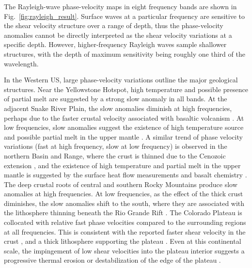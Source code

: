 The Rayleigh-wave phase-velocity maps in eight frequency bands are shown in Fig.~\ref{fig:rayleigh_result}. Surface waves at a particular frequency are sensitive to the shear velocity structure over a range of depth, thus the phase-velocity anomalies cannot be directly interpreted as the shear velocity variations at a specific depth. However, higher-frequency Rayleigh waves sample shallower structures, with the depth of maximum sensitivity being roughly one third of the wavelength.

In the Western US, large phase-velocity variations outline the major geological structures. Near the Yellowstone Hotspot, high temperature and possible presence of partial melt are suggested by a strong slow anomaly in all bands. At the adjacent Snake River Plain, the slow anomalies diminish at high frequencies, perhaps due to the faster crustal velocity associated with basaltic volcanism \citep[e.g.,][]{Sparlin:1982cx,Peng:1998dm}. At low frequencies, slow anomalies suggest the existence of high temperature source and possible partial melt in the upper mantle \citep[e.g.,][]{Saltzer:1997jh}.
A similar trend of phase velocity variations (fast at high frequency, slow at low frequency) is observed in the northern Basin and Range, where the crust is thinned due to the Cenozoic extension \citep[e.g.,][]{Zandt:1995wp}, and the existence of high temperature and partial melt in the upper mantle is suggested by the surface heat flow measurements \citep[e.g.,][]{Lysak:1992fj} and basalt chemistry \citep[e.g.,][]{Gazel:2012fq}. The deep crustal roots of central and southern Rocky Mountains produce slow anomalies at high frequencies. At low frequencies, as the effect of the thick crust diminishes, the slow anomalies shift to the south, where they are associated with the lithosphere thinning beneath the Rio Grande Rift \citep[e.g.,][]{Gao:2004fr}. The Colorado Plateau is collocated with relative fast phase velocities compared to the surrounding regions at all frequencies. This is consistent with the reported faster shear velocity in the crust \citep[e.g.,][]{Bailey:2012jd}, and a thick lithosphere supporting the plateau \citep[e.g.,][]{Lee:2001ff}. Even at this continental scale, the impingement of low shear velocities into the plateau interior suggests a progressive thermal erosion or destabilization of the edge of the plateau \citep[e.g.,][]{Roy:2009gq,Levander:2011jc}.

